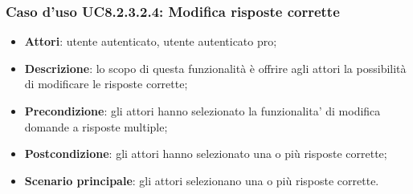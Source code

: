 \subsubsection{Caso d'uso UC8.2.3.2.4: Modifica risposte corrette}
	\begin{itemize}
		\item
			\textbf{Attori}: utente autenticato, utente autenticato pro;
		\item		
			\textbf{Descrizione}: lo scopo di questa funzionalità è offrire agli attori la possibilità di modificare le risposte corrette;
		\item
			\textbf{Precondizione}: gli attori hanno selezionato la funzionalita' di modifica domande a risposte multiple; 
		\item
			\textbf{Postcondizione}: gli attori hanno selezionato una o più risposte corrette;
		\item
			\textbf{Scenario principale}: gli attori selezionano una o più risposte corrette. 			
	\end{itemize}

	
	
	
	
	
	
	
